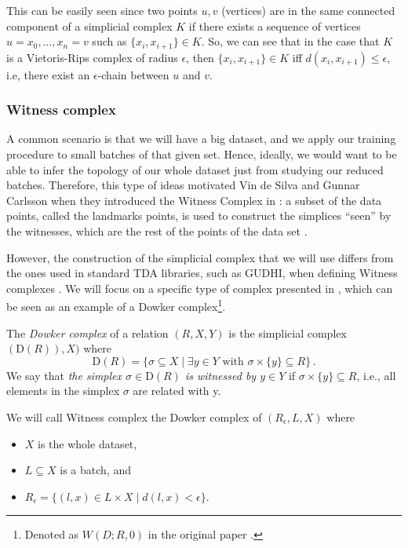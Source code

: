 \documentclass[../main.tex]{subfiles}
\begin{document}
This can be easily seen since two points $u,v$ (vertices) are in the same connected component of a simplicial complex $K$ if there exists a sequence of vertices $u=x_0,..., x_n=v$ such as $\{x_i, x_{i+1}\} \in K$. So, we can see that in the case that $K$ is a Vietoris-Rips complex of radius $\epsilon$, then $\{x_i, x_{i+1}\} \in K$ iff $d(x_i, x_{i+1})\leq\epsilon$, i.e, there exist an $\epsilon$-chain between $u$ and $v$. 

\subsubsection*{Witness complex}

A common  scenario is that we will have a big dataset, and we apply our training procedure to small batches of that given set. Hence, ideally, we would want to be able to infer the topology of our whole dataset just from studying our reduced batches. Therefore, this type of ideas motivated Vin de Silva and Gunnar Carlsson when they introduced the Witness Complex in \cite{silva_topological_2004}: a subset of the data points, called the landmarks points, is used to construct the simplices ``seen'' by the witnesses, which are the rest of the points of the data set \cite{medbouhi_towards_2022}.

However, the construction of the simplicial complex that we will use differs from the ones used in standard TDA libraries, such as GUDHI, when defining Witness complexes \cite{noauthor_gudhi_nodate}. We will focus on a specific type of complex presented in \cite{silva_topological_2004}, which can be seen as an example of a Dowker complex\footnote{Denoted as $W(D; R, 0)$ in the original paper \cite{silva_topological_2004}.}.

\begin{definition}
The \emph{Dowker complex} of a relation $(R, X, Y)$ is the simplicial complex $(\text{D}(R)), X)$ where
\[
\text{D}(R) = \{\sigma \subseteq X \mid \exists y \in Y \text{ with } \sigma \times \{y\} \subseteq R\}\,.
\]
We say that \emph{ the simplex $\sigma \in \text{D}(R)$ is witnessed by $y \in Y$} if $\sigma \times \{y\} \subseteq R$, i.e., all elements in the simplex $\sigma$ are related with y.
\end{definition}

We will call Witness complex the Dowker complex of $(R_\epsilon, L, X)$ where
\begin{itemize}
    \item $X$ is the whole dataset,
    \item $L\subseteq X$ is a batch, and
    \item $R_\epsilon=\{(l,x)\in L \times X \mid d(l,x)<\epsilon\}$. 
\end{itemize}
\end{document}
